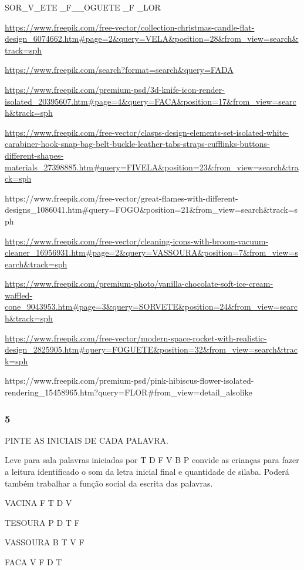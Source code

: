 SOR\_V\_ETE \_F\_\_OGUETE \_F \_LOR

\url{https://www.freepik.com/free-vector/collection-christmas-candle-flat-design_6074662.htm\#page=2\&query=VELA\&position=28\&from_view=search\&track=sph}

\url{https://www.freepik.com/search?format=search\&query=FADA}

\url{https://www.freepik.com/premium-psd/3d-knife-icon-render-isolated_20395607.htm\#page=4\&query=FACA\&position=17\&from_view=search\&track=sph}

\url{https://www.freepik.com/free-vector/clasps-design-elements-set-isolated-white-carabiner-hook-snap-bag-belt-buckle-leather-tabs-straps-cufflinks-buttons-different-shapes-materials_27398885.htm\#query=FIVELA\&position=23\&from_view=search\&track=sph}

https://www.freepik.com/free-vector/great-flames-with-different-designs\_1086041.htm\#query=FOGO\&position=21\&from\_view=search\&track=sph

\url{https://www.freepik.com/free-vector/cleaning-icons-with-broom-vacuum-cleaner_16956931.htm\#page=2\&query=VASSOURA\&position=7\&from_view=search\&track=sph}

\url{https://www.freepik.com/premium-photo/vanilla-chocolate-soft-ice-cream-waffled-cone_9043953.htm\#page=3\&query=SORVETE\&position=24\&from_view=search\&track=sph}

\url{https://www.freepik.com/free-vector/modern-space-rocket-with-realistic-design_2825905.htm\#query=FOGUETE\&position=32\&from_view=search\&track=sph}

https://www.freepik.com/premium-psd/pink-hibiscus-flower-isolated-rendering\_15458965.htm?query=FLOR\#from\_view=detail\_alsolike

\subsubsection{5 }\label{section-4}

PINTE AS INICIAIS DE CADA PALAVRA.

Leve para sala palavras iniciadas por T D F V B P convide as crianças
para fazer a leitura identificado o som da letra inicial final e
quantidade de silaba. Poderá também trabalhar a função social da escrita
das palavras.

VACINA F T D V

TESOURA P D T F

VASSOURA B T V F

FACA V F D T


